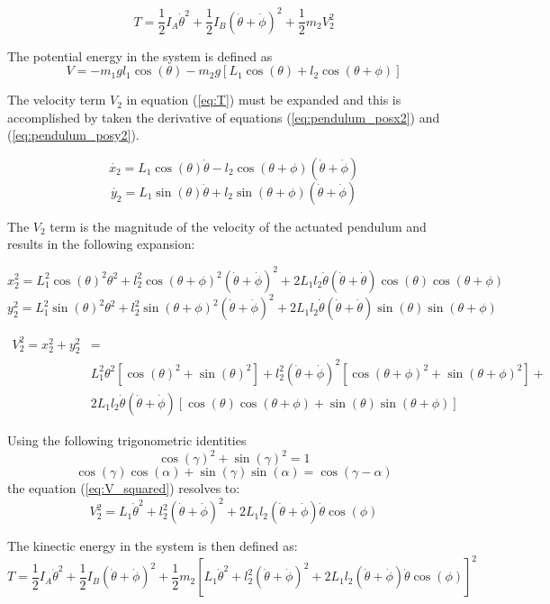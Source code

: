\begin{equation}
\label{eq:T}
T = \frac{1}{2}I_{A}\dot{\theta}^2 + \frac{1}{2}I_{B}(\dot{\theta}+\dot{\phi})^2 + \frac{1}{2}m_{2}V_{2}^2
\end{equation}

The potential energy in the system is defined as
$$V=-m_{1}gl_{1}\cos(\theta)-m_{2}g[L_{1}\cos(\theta)+l_{2}\cos(\theta+\phi)]$$

The velocity term $V_{2}$ in equation (\ref{eq:T}) must be expanded and this is accomplished by taken the derivative of equations (\ref{eq:pendulum_posx2}) and (\ref{eq:pendulum_posy2}).

$$\dot{x_{2}} = L_{1}\cos(\theta)\dot{\theta} - l_{2}\cos(\theta+\phi)(\dot{\theta}+\dot{\phi}) $$
$$\dot{y_{2}} = L_{1}\sin(\theta)\dot{\theta}+l_{2}\sin(\theta+\phi)(\dot{\theta}+\dot{\phi})$$

The $V_{2}$ term is the magnitude of the velocity of the actuated pendulum and results in the following expansion:

$$x_{2}^2 = L_{1}^2\cos(\theta)^2\theta^2 +l_{2}^2\cos(\theta+\phi)^2(\dot{\theta}+\dot{\phi})^2 + 2L_{1}l_{2}\dot{\theta}(\dot{\theta}+\dot{\theta})\cos(\theta)\cos(\theta+\phi)$$
$$y_{2}^2 = L_{1}^2\sin(\theta)^2\theta^2 +l_{2}^2\sin(\theta+\phi)^2(\dot{\theta}+\dot{\phi})^2 + 2L_{1}l_{2}\dot{\theta}(\dot{\theta}+\dot{\theta})\sin(\theta)\sin(\theta+\phi)$$

\begin{equation}
\label{eq:V_squared}
\begin{split}
V_{2}^2 = x_{2}^2+y_{2}^2 & = \\ &L_{1}^2\theta^2[\cos(\theta)^2+\sin(\theta)^2]+l_{2}^2(\dot{\theta}+\dot{\phi})^2[\cos(\theta+\phi)^2+\sin(\theta+\phi)^2] + \\
&2L_{1}l_{2}\dot{\theta}(\dot{\theta}+\dot{\phi})[\cos(\theta)\cos(\theta+\phi)+\sin(\theta)\sin(\theta+\phi)]
\end{split}
\end{equation}

Using the following trigonometric identities $$ \cos(\gamma)^2 + \sin(\gamma)^2 = 1 $$ 
$$ \cos(\gamma)\cos(\alpha)+\sin(\gamma)\sin(\alpha) = \cos(\gamma - \alpha) $$ the equation (\ref{eq:V_squared}) resolves to: $$ V_{2}^2 = L_{1}\dot{\theta}^2+l_{2}^2(\dot{\theta}+\dot{\phi})^2 + 
2L_{1}l_{2}(\dot{\theta}+\dot{\phi})\dot{\theta}\cos(\phi)$$

The kinectic energy in the system is then defined as:
$$ T = \frac{1}{2}I_{A}\dot{\theta}^2 + \frac{1}{2}I_{B}(\dot{\theta}+\dot{\phi})^2 + \frac{1}{2}m_{2}[L_{1}\dot{\theta}^2+l_{2}^2(\dot{\theta}+\dot{\phi})^2 + 
2L_{1}l_{2}(\dot{\theta}+\dot{\phi})\dot{\theta}\cos(\phi)]^2$$


